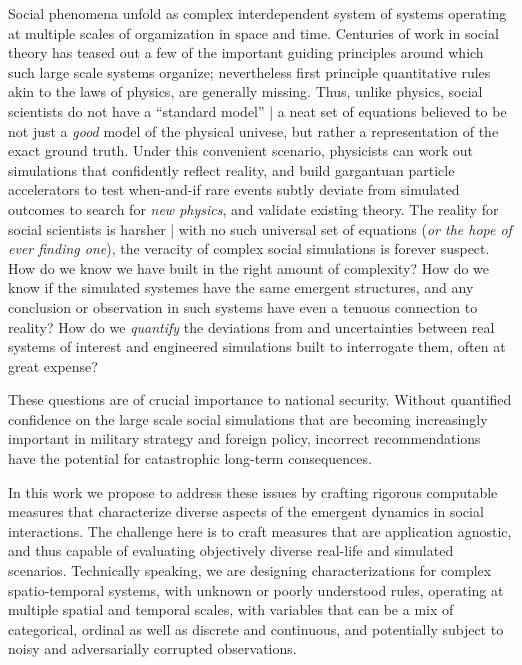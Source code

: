 \documentclass[onecolumn, compsoc,11pt]{IEEEtran}
\begin{document}
Social phenomena unfold as complex interdependent system of systems operating at multiple scales  of orgamization in space and time. Centuries of work in social theory  has teased out a few of the important  guiding principles around which such large scale  systems organize; nevertheless first principle quantitative rules  akin to the laws of physics, are generally  missing. Thus, unlike physics, social scientists do not have a ``standard model'' | a neat set of equations  believed  to be not just a \textit{good} model of the physical univese, but rather a representation of the exact ground truth. Under  this convenient  scenario, physicists  can work out simulations that confidently reflect reality, and build gargantuan particle accelerators to test when-and-if  rare events subtly deviate from simulated outcomes to search for \textit{new physics}, and validate existing theory. The reality for social scientists is harsher | with no such universal set of equations (\textit{or the hope of ever finding one}), the veracity of complex social simulations is forever suspect. How do we know we have built in the right amount of complexity? How do we know if the simulated systemes have the same emergent structures, and any conclusion or observation in such systems have even a tenuous  connection to  reality? How do we \textit{quantify} the deviations from and uncertainties between real systems of interest  and engineered simulations built to interrogate them, often at great expense?


These questions are of crucial importance to national security. Without quantified confidence on the large scale social simulations that are becoming increasingly important in military strategy and foreign policy,  incorrect recommendations have the potential for  catastrophic long-term consequences.


In this work we propose to address these issues by crafting rigorous computable measures  that characterize diverse aspects of the  emergent dynamics in social interactions. The challenge here is to  craft measures that are application agnostic, and thus capable of evaluating  objectively  diverse real-life and simulated scenarios. Technically speaking, we are  designing characterizations for complex spatio-temporal systems, with unknown or poorly understood rules, operating at multiple spatial and temporal scales, with variables that can be a mix of categorical, ordinal as well as discrete and continuous, and potentially subject to noisy and  adversarially corrupted observations.
\end{document}

